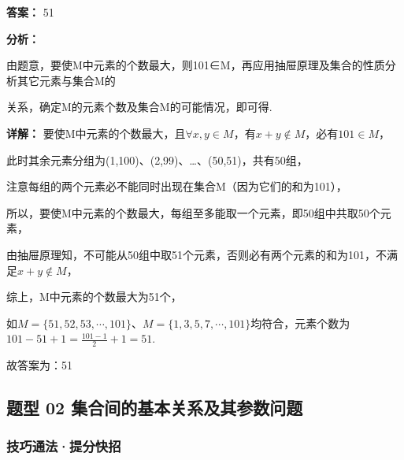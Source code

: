 \documentclass[11pt,a4paper]{ctexart}
\begin{document}
\textbf{答案：}
51

\textbf{分析：}

由题意，要使M中元素的个数最大，则101∈M，再应用抽屉原理及集合的性质分析其它元素与集合M的

关系，确定M的元素个数及集合M的可能情况，即可得.

\textbf{详解：}
要使M中元素的个数最大，且\(\forall x,y\in M\)，有\(x+y\notin M\)，必有\(101\in M\)，

此时其余元素分组为(1,100)、(2,99)、\ldots、(50,51)，共有50组，

注意每组的两个元素必不能同时出现在集合M（因为它们的和为101），

所以，要使M中元素的个数最大，每组至多能取一个元素，即50组中共取50个元素，

由抽屉原理知，不可能从50组中取51个元素，否则必有两个元素的和为101，不满足\(x + y \notin M\)，

综上，M中元素的个数最大为51个，

如\(M=\{51,52,53,\cdots,101\}\)、\(M=\{1,3,5,7,\cdots,101\}\)均符合，元素个数为\(101-51+1=\frac{101-1}{2}+1=51\).

故答案为：51\subsection{题型 02
集合间的基本关系及其参数问题}\label{ux9898ux578b-02-ux96c6ux5408ux95f4ux7684ux57faux672cux5173ux7cfbux53caux5176ux53c2ux6570ux95eeux9898}

\subsubsection{技巧通法·提分快招}\label{ux6280ux5de7ux901aux6cd5ux63d0ux5206ux5febux62db-1}
\end{document}
